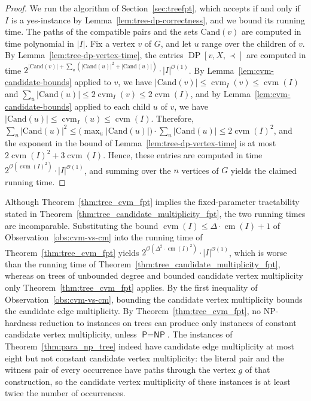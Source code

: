 \documentclass[a4paper,USenglish,thm-restate]{lipics-v2021}
\newcommand{\cm}{\operatorname{cm}}
\newcommand{\cvm}{\operatorname{cvm}}
\newcommand{\cand}{\mathrm{Cand}}
\theoremstyle{problemstyle}
\begin{document}
\treeCandidateVertexMultiplicityFpt*

\begin{proof}
We run the algorithm of Section~\ref{sec:treefpt}, which accepts if and only if $I$ is a yes-instance by Lemma~\ref{lem:tree-dp-correctness}, and we bound its running time. The paths of the compatible pairs and the sets $\cand(v)$ are computed in time polynomial in $|I|$. Fix a vertex $v$ of $G$, and let $u$ range over the children of $v$. By Lemma~\ref{lem:tree-dp-vertex-time}, the entries $\operatorname{DP}[v,X,\prec]$ are computed in time $2^{|\cand(v)|+\sum_u(|\cand(u)|^2+|\cand(u)|)}\cdot|I|^{\mathcal{O}(1)}$. By Lemma~\ref{lem:cvm-candidate-bounds} applied to $v$, we have $|\cand(v)|\le\cvm_I(v)\le\cvm(I)$ and $\sum_u|\cand(u)|\le 2\cvm_I(v)\le 2\cvm(I)$, and by Lemma~\ref{lem:cvm-candidate-bounds} applied to each child $u$ of $v$, we have $|\cand(u)|\le\cvm_I(u)\le\cvm(I)$. Therefore, $\sum_u|\cand(u)|^2\le\bigl(\max_u|\cand(u)|\bigr)\cdot\sum_u|\cand(u)|\le 2\cvm(I)^2$, and the exponent in the bound of Lemma~\ref{lem:tree-dp-vertex-time} is at most $2\cvm(I)^2+3\cvm(I)$. Hence, these entries are computed in time $2^{\mathcal{O}(\cvm(I)^2)}\cdot|I|^{\mathcal{O}(1)}$, and summing over the $n$ vertices of $G$ yields the claimed running time.
\end{proof}


Although Theorem~\ref{thm:tree_cvm_fpt} implies the fixed-parameter tractability stated in Theorem~\ref{thm:tree_candidate_multiplicity_fpt}, the two running times are incomparable. Substituting the bound $\cvm(I)\le\Delta\cdot\cm(I)+1$ of Observation~\ref{obs:cvm-vs-cm} into the running time of Theorem~\ref{thm:tree_cvm_fpt} yields $2^{\mathcal{O}(\Delta^2\cdot\cm(I)^2)}\cdot|I|^{\mathcal{O}(1)}$, which is worse than the running time of Theorem~\ref{thm:tree_candidate_multiplicity_fpt}, whereas on trees of unbounded degree and bounded candidate vertex multiplicity only Theorem~\ref{thm:tree_cvm_fpt} applies. By the first inequality of Observation~\ref{obs:cvm-vs-cm}, bounding the candidate vertex multiplicity bounds the candidate edge multiplicity. By Theorem~\ref{thm:tree_cvm_fpt}, no \textsf{NP}-hardness reduction to instances on trees can produce only instances of constant candidate vertex multiplicity, unless $\textsf{P}=\textsf{NP}$. The instances of Theorem~\ref{thm:para_np_tree} indeed have candidate edge multiplicity at most eight but not constant candidate vertex multiplicity: the literal pair and the witness pair of every occurrence have paths through the vertex $g$ of that construction, so the candidate vertex multiplicity of these instances is at least twice the number of occurrences.
\end{document}
